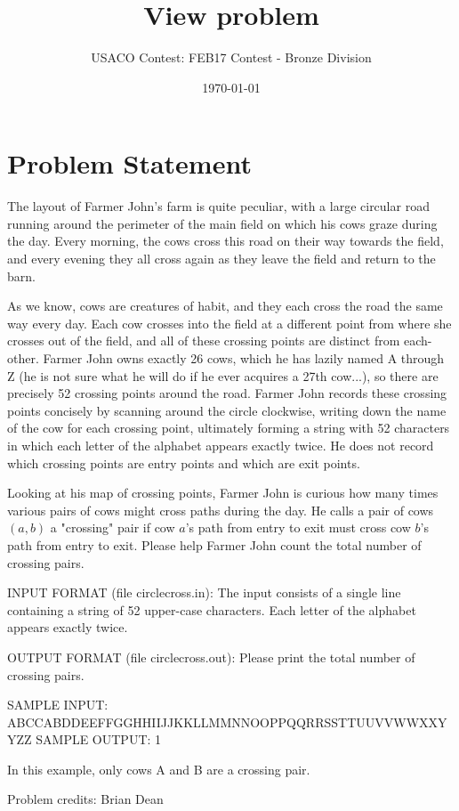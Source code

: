 \documentclass[12pt]{article}
\title{View problem}
\author{USACO Contest: FEB17 Contest - Bronze Division}
\date{\today}
\begin{document}
\maketitle

\section*{Problem Statement}

The layout of Farmer John's farm is quite peculiar, with a large circular road
running around the perimeter of the main field on which his cows graze during
the day. Every morning, the cows cross this road on their way towards the field,
and every evening they all cross again as they leave the field and return to the
barn.

As we know, cows are creatures of habit, and they each cross the road the same
way every day.  Each cow crosses into the field at a different point from where
she crosses out of the field, and all of these crossing points are distinct from
each-other. Farmer John owns exactly 26 cows, which he has lazily named A
through Z (he is not sure what he will do if he ever acquires a  27th cow...),
so there are precisely 52 crossing points around the road.  Farmer John records
these crossing points concisely by scanning around the circle clockwise, writing
down the name of the cow for each crossing point, ultimately forming a string
with 52 characters in which each letter of the alphabet appears exactly twice. 
He does not record which crossing points are entry points and which are
exit points.

Looking at his map of crossing points, Farmer John is curious how many times
various pairs of cows might cross paths during the day.  He calls a pair of cows
$(a,b)$ a "crossing" pair if cow $a$'s path from entry to exit must cross cow
$b$'s path from entry to exit.  Please help Farmer John count the total number
of crossing pairs.

INPUT FORMAT (file circlecross.in):
The input consists of a single line containing a string of 52 upper-case
characters.  Each letter of the alphabet appears exactly twice.

OUTPUT FORMAT (file circlecross.out):
Please print the total number of crossing pairs.

SAMPLE INPUT:
ABCCABDDEEFFGGHHIIJJKKLLMMNNOOPPQQRRSSTTUUVVWWXXYYZZ
SAMPLE OUTPUT: 
1

In this example, only cows A and B are a crossing pair.


Problem credits: Brian Dean
\end{document}
